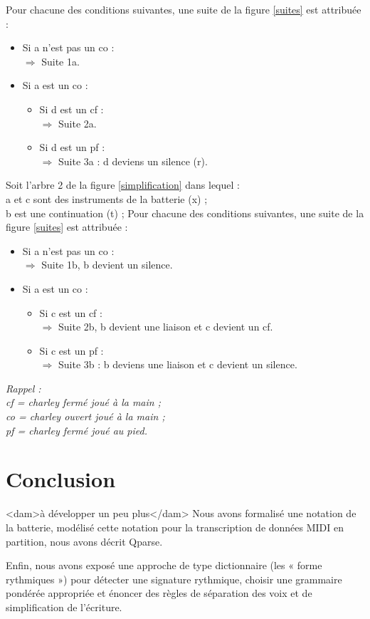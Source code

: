 Pour chacune des conditions suivantes, une suite de la figure \ref{suites} est attribuée :
\begin{itemize}
	\item Si a n’est pas un co :\\
	$\Rightarrow$ Suite 1a.
	\item Si a est un co :
	\begin{itemize}
		\item Si d est un cf :\\
		$\Rightarrow$ Suite 2a.
		\item Si d est un pf :\\
		$\Rightarrow$ Suite 3a : d deviens un silence (r).\\
	\end{itemize}
\end{itemize}
Soit l’arbre 2 de la figure \ref{simplification} dans lequel :\\
a et c sont des instruments de la batterie (x) ;\\
b est une continuation (t) ;
Pour chacune des conditions suivantes, une suite de la figure \ref{suites} est attribuée :
\begin{itemize}
	\item Si a n’est pas un co :\\
	$\Rightarrow$ Suite 1b, b devient un silence.
	\item Si a est un co :
	\begin{itemize}
		\item Si c est un cf :\\
		$\Rightarrow$ Suite 2b, b devient une liaison et c devient un cf.
		\item Si c est un pf :\\
		$\Rightarrow$ Suite 3b : b deviens une liaison et c devient un silence.\\
	\end{itemize}
\end{itemize}
\textit{Rappel :\\cf = charley fermé joué à la main ;\\co = charley ouvert joué à la main ;\\ pf = charley fermé joué au pied.}\\

\section*{Conclusion}
<dam>à développer un peu plus</dam>
Nous avons formalisé une notation de la batterie, modélisé cette notation pour
la transcription de données MIDI en partition, nous avons décrit Qparse.

Enfin, nous avons exposé une approche de type dictionnaire (les « forme
rythmiques ») pour détecter une signature rythmique, choisir une grammaire
pondérée appropriée et énoncer des règles de séparation des voix et de
simplification de l’écriture.
